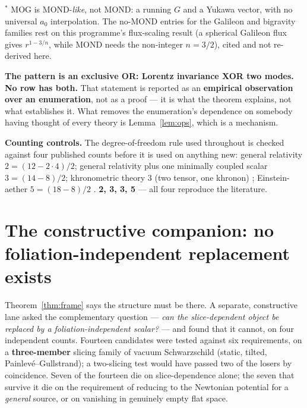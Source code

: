 \documentclass[11pt,letterpaper]{article}
\begin{document}
$^{*}$ MOG is MOND-\emph{like}, not MOND: a running $G$ and a Yukawa vector, with no universal $a_0$ interpolation. The no-MOND entries for the Galileon and bigravity families rest on this programme's flux-scaling result (a spherical Galileon flux gives $r^{1-3/n}$, while MOND needs the non-integer $n=3/2$), cited and not re-derived here.

\textbf{The pattern is an exclusive OR: Lorentz invariance XOR two modes. No row has both.} That statement is reported as an \textbf{empirical observation over an enumeration}, not as a proof --- it is what the theorem explains, not what establishes it. What removes the enumeration's dependence on somebody having thought of every theory is Lemma~\ref{lem:ops}, which is a mechanism.

\textbf{Counting controls.} The degree-of-freedom rule used throughout is checked against four published counts before it is used on anything new: general relativity $2=(12-2\cdot4)/2$; general relativity plus one minimally coupled scalar $3=(14-8)/2$; khronometric theory $3$ (two tensor, one khronon) \cite{Blas2011}; Einstein-aether $5=(18-8)/2$ \cite{JacobsonMattingly2001,FosterJacobson2006}. \textbf{2, 3, 3, 5} --- all four reproduce the literature.

\section{The constructive companion: no foliation-independent replacement exists}\label{sec:companion}

Theorem~\ref{thm:frame} says the structure must be there. A separate, constructive lane asked the complementary question --- \emph{can the slice-dependent object be replaced by a foliation-independent scalar?} --- and found that it cannot, on four independent counts. Fourteen candidates were tested against six requirements, on a \textbf{three-member} slicing family of vacuum Schwarzschild (static, tilted, Painlev\'e--Gullstrand); a two-slicing test would have passed two of the losers by coincidence. Seven of the fourteen die on slice-dependence alone; the seven that survive it die on the requirement of reducing to the Newtonian potential for a \emph{general} source, or on vanishing in genuinely empty flat space.
\end{document}
